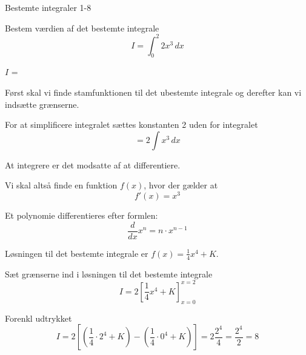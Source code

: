 \documentclass{article}
\begin{document}
\begin{exercise}{Bestemte integraler 1-8}

Bestem værdien af det bestemte integrale
\[
I = \int_0^2 2x^3 \, dx
\]

$I$ = 


\hint
Først skal vi finde stamfunktionen til det ubestemte integrale og derefter kan vi indsætte grænserne.

\hint
For at simplificere integralet sættes konstanten 2 uden for integralet
\[
= 2 \int x^3 \, dx
\]

\hint
At integrere er det modsatte af at differentiere.

\hint
Vi skal altså finde en funktion $f(x)$, hvor der gælder at
\[
f'(x) = x^3
\]

\hint
Et polynomie differentieres efter formlen:
\[
\frac{d}{dx} x^n = n \cdot x^{n - 1}
\]

\hint
Løsningen til det bestemte integrale er $f(x) = \frac{1}{4} x^4 + K$.

\hint
Sæt grænserne ind i løsningen til det bestemte integrale
\[
I = 2 \left[ \frac{1}{4} x^4 + K \right]_{x=0}^{x=2}
\]

\hint
Forenkl udtrykket
\[
I =2 \left[ \left( \frac{1}{4} \cdot 2^4 + K \right) - \left( \frac{1}{4} \cdot 0^4 + K \right) \right] = 2 \frac{2^4}{4} = \frac{2^4}{2} = 8
\]


\end{exercise}
\end{document}
